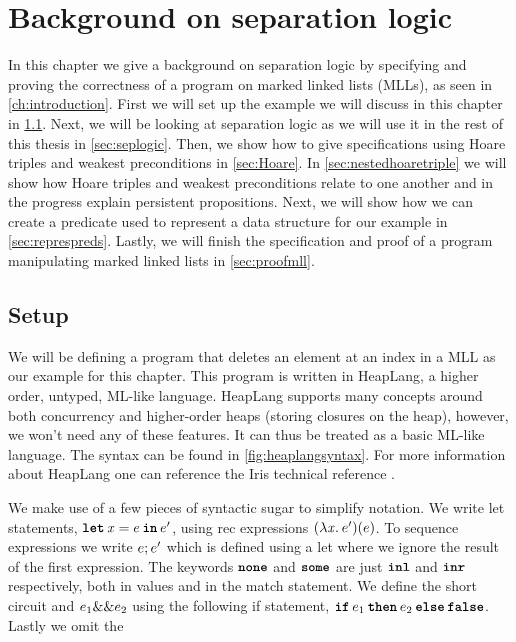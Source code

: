 \documentclass[thesis.tex]{subfiles}
\begin{document}
\chapter{Background on separation logic}
\label{ch:backgroundseplogic}

In this chapter we give a background on separation logic by specifying and proving the correctness of a program on marked linked lists (MLLs), as seen in \cref*{ch:introduction}. First we will set up the example we will discuss in this chapter in \cref*{sec:irissetup}. Next, we will be looking at separation logic as we will use it in the rest of this thesis in \cref*{sec:seplogic}. Then, we show how to give specifications using Hoare triples and weakest preconditions in \cref*{sec:Hoare}. In \cref*{sec:nestedhoaretriple} we will show how Hoare triples and weakest preconditions relate to one another and in the progress explain persistent propositions. Next, we will show how we can create a predicate used to represent a data structure for our example in \cref*{sec:represpreds}. Lastly, we will finish the specification and proof of a program manipulating marked linked lists in \cref*{sec:proofmll}.

\section{Setup}
\label{sec:irissetup}
We will be defining a program that deletes an element at an index in a MLL as our example for this chapter. This program is written in HeapLang, a higher order, untyped, ML-like language. HeapLang supports many concepts around both concurrency and higher-order heaps (storing closures on the heap), however, we won't need any of these features. It can thus be treated as a basic ML-like language. The syntax can be found in \cref*{fig:heaplangsyntax}. For more information about HeapLang one can reference the Iris technical reference \cite*{iristeamIrisReference2023}.

We make use of a few pieces of syntactic sugar to simplify notation. We write let statements, $\Let \lvar = \expr in \expr'$, using rec expressions $(\Lam \lvar. \expr')(\expr)$. To sequence expressions we write $e; e'$ which is defined using a let where we ignore the result of the first expression. The keywords $\operatorname{\texttt{\bfseries none}}$ and $\operatorname{\texttt{\bfseries some}}$ are just $\operatorname{\texttt{\bfseries inl}}$ and $\operatorname{\texttt{\bfseries inr}}$ respectively, both in values and in the match statement. We define the short circuit and $e_1 \&\& e_2$ using the following if statement, $\If \expr_1 then \expr_2 \Else \False$. Lastly we omit the
\end{document}
